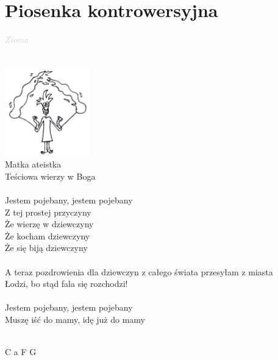 \documentclass[a5paper, 10pt]{book}
\begin{document}
\section{Piosenka kontrowersyjna}\textcolor{lightgray}{\textit{Zioma}}\\
\begin{minipage}[t]{0.8\textwidth}
  ~\\
  \hspace*{6.5cm}\includegraphics[height=3.9cm,left]{images/piosenka_kontrowersyjna.png}\vspace*{-3.91cm}\\
  Matka ateistka							\\
  Teściowa wierzy w Boga\\
  \\
  \hspace*{4mm}Jestem pojebany, jestem pojebany\\
  \hspace*{4mm}Z tej prostej przyczyny\\
  \hspace*{8mm}Że wierzę w dziewczyny\\
  \hspace*{8mm}Że kocham dziewczyny\\
  \hspace*{8mm}Że się biją dziewczyny\\
  \\
  A teraz pozdrowienia dla dziewczyn z całego świata przesyłam z miasta\\
  Łodzi, bo stąd fala się rozchodzi!\\
  \\
  Jestem pojebany, jestem pojebany				\\
  Muszę iść do mamy, idę już do mamy\\
\end{minipage}
\begin{minipage}[t]{0.2\textwidth}
  ~\\
  C a F G\\
\end{minipage}

\end{document}

